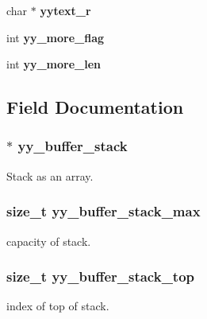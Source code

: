 \begin{DoxyCompactItemize}
\item 
\hypertarget{structyyguts__t_a3195f378eaf8edc85f383798ce9e3275}{
char $\ast$ {\bfseries yytext\_\-r}}
\label{structyyguts__t_a3195f378eaf8edc85f383798ce9e3275}

\item 
\hypertarget{structyyguts__t_a6129ee9fdda293cab1800b69a9d89871}{
int {\bfseries yy\_\-more\_\-flag}}
\label{structyyguts__t_a6129ee9fdda293cab1800b69a9d89871}

\item 
\hypertarget{structyyguts__t_a4bdb55a62cfaaf9a9d47fc08f2afc526}{
int {\bfseries yy\_\-more\_\-len}}
\label{structyyguts__t_a4bdb55a62cfaaf9a9d47fc08f2afc526}

\end{DoxyCompactItemize}


\subsection{Field Documentation}
\hypertarget{structyyguts__t_a49bfb4502fc4aa7932467897ba827ecc}{
\subsubsection[{yy\_\-buffer\_\-stack}]{ $\ast$ {\bf yy\_\-buffer\_\-stack}}}
\label{structyyguts__t_a49bfb4502fc4aa7932467897ba827ecc}
Stack as an array. \hypertarget{structyyguts__t_a437cdcd878686881404e320fd941929c}{
\subsubsection[{yy\_\-buffer\_\-stack\_\-max}]{\setlength{\rightskip}{0pt plus 5cm}size\_\-t {\bf yy\_\-buffer\_\-stack\_\-max}}}
\label{structyyguts__t_a437cdcd878686881404e320fd941929c}
capacity of stack. \hypertarget{structyyguts__t_ae54779a12769204c826899d0531e40e6}{
\subsubsection[{yy\_\-buffer\_\-stack\_\-top}]{\setlength{\rightskip}{0pt plus 5cm}size\_\-t {\bf yy\_\-buffer\_\-stack\_\-top}}}
\label{structyyguts__t_ae54779a12769204c826899d0531e40e6}
index of top of stack. 

